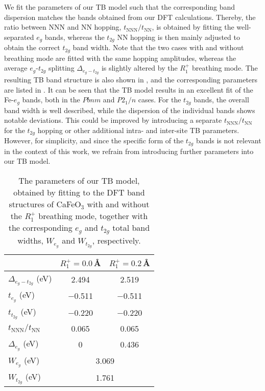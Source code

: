 \documentclass[aps,prb,twocolumn,superscriptaddress,10pt]{revtex4-1}
\newcommand{\pref}[1]{\prettyref{#1}}%
\newcommand{\BM}{\ensuremath{{R_1^+}}\xspace}
\newcommand{\eg}{\ensuremath{{e_g}}\xspace}
\newcommand{\ttg}{\ensuremath{{t_{2g}}}\xspace}
\newcommand{\CFO}{CaFeO$_3$\xspace}
\begin{document}
We fit the parameters of our TB model such that the corresponding band dispersion matches the bands obtained from our DFT calculations. Thereby, the ratio between NNN and NN hopping, $t_\text{NNN}/t_\text{NN}$, is obtained by fitting the well-separated \eg bands, whereas the \ttg NN hopping is then mainly adjusted to obtain the correct \ttg band width. Note that the two cases with and without breathing mode are fitted with the same hopping amplitudes, whereas the average \eg-\ttg splitting $\Delta_{\eg - \ttg}$ is slightly altered by the \BM{} breathing mode. 
%
The resulting TB band structure is also shown in \pref{fig:bands_dft_tb}, and the corresponding parameters are listed in \pref{tab:tb_parameters}. It can be seen that the TB model results in an excellent fit of the Fe-\eg bands, both in the $Pbnm$ and $P2_1/n$ cases. For the \ttg bands, the overall band width is well described, while the dispersion of the individual bands shows notable deviations. This could be improved by introducing a separate $t_\text{NNN}/t_\text{NN}$ for the \ttg hopping or other additional intra- and inter-site TB parameters. However, for simplicity, and since the specific form of the \ttg bands is not relevant in the context of this work, we refrain from introducing further parameters into our TB model.

\begin{table}
    \centering
    \caption{The parameters of our TB model, obtained by fitting to the DFT band structures of \CFO with and without the \BM breathing mode, together with the corresponding $e_g$ and $t_{2g}$ total band widths, $W_{e_g}$ and $W_{t_{2g}}$, respectively.}
    \label{tab:tb_parameters}
    \begin{ruledtabular}
    \begin{tabular}{lcc}
        & $\BM{}=0.0$\,\AA & $\BM =0.2$\,\AA \\
        \hline
        $\Delta_{\eg - \ttg}$ (\si{eV}) & 2.494 & 2.519 \\
        $t_\eg$ (\si{eV}) & $-$0.511 & $-$0.511 \\
        $t_\ttg$ (\si{eV}) & $-$0.220 & $-$0.220 \\
        $t_\text{NNN}/t_\text{NN}$ & 0.065 & 0.065 \\
        $\Delta_\eg$ (\si{eV}) & 0 & 0.436 \\
        \hline
        $W_\eg$ (\si{eV}) & \multicolumn{2}{c}{3.069} \\
        $W_\ttg$ (\si{eV}) & \multicolumn{2}{c}{1.761} 
    \end{tabular}
\end{ruledtabular}
\end{table}
\end{document}
